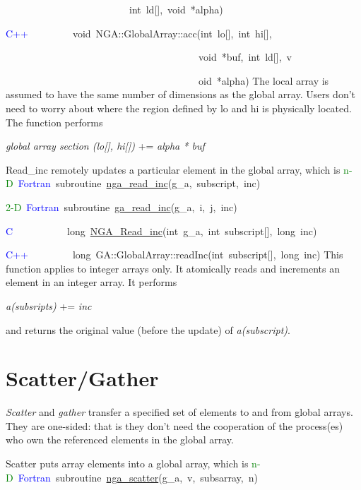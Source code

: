 ~~~~~~~~~~~~~~~~~~~~~~~~~int~ld{[}{]},~void~{*}alpha)~

\textcolor{blue}{C++}~~~~~~~~~void~NGA::GlobalArray::acc(int~lo{[}{]},~int~hi{[}{]},~

~~~~~~~~~~~~~~~~~~~~~~~~~~~~~~~~~~~~~~~void~{*}buf,~int~ld{[}{]},~v

~~~~~~~~~~~~~~~~~~~~~~~~~~~~~~~~~~~~~~~oid~{*}alpha)
The local array is assumed to have the same number of dimensions as
the global array. Users don't need to worry about where the region
defined by lo and hi is physically located. The function performs

\emph{global array section (lo{[}{]}, hi{[}{]})} += \emph{alpha {*}
buf}

Read\_inc remotely updates a particular element in the global array,
which is
\textcolor{green}{n-D}~\textcolor{blue}{Fortran}~subroutine~\href{http://www.emsl.pnl.gov/docs/global/ga_ops.html\#ga_read_inc}{nga\_{}read\_{}inc}(g\_a,~subscript,~inc)~

\textcolor{green}{2-D}~\textcolor{blue}{Fortran}~subroutine~\href{http://www.emsl.pnl.gov/docs/global/ga_ops.html\#ga_read_inc}{ga\_{}read\_{}inc}(g\_a,~i,~j,~inc)~

\textcolor{blue}{C}~~~~~~~~~~~long~\href{http://www.emsl.pnl.gov/docs/global/c_nga_ops.html\#ga_read_inc}{NGA\_{}Read\_{}inc}(int~g\_a,~int~subscript{[}{]},~long~inc)~

\textcolor{blue}{C++}~~~~~~~~~long~GA::GlobalArray::readInc(int~subscript{[}{]},~long~inc)
This function applies to integer arrays only. It atomically reads
and increments an element in an integer array. It performs

\emph{a(subsripts)} += \emph{inc}

and returns the original value (before the update) of \emph{a(subscript)}. 


\section{Scatter/Gather }

\emph{Scatter} and \emph{gather} transfer a specified set of elements
to and from global arrays. They are one-sided: that is they don't
need the cooperation of the process(es) who own the referenced elements
in the global array.

Scatter puts array elements into a global array, which is
\textcolor{green}{n-D}~\textcolor{blue}{Fortran}~subroutine~\href{http://www.emsl.pnl.gov/docs/global/ga_ops.html\#ga_scatter}{nga\_{}scatter}(g\_a,~v,~subsarray,~n)~

